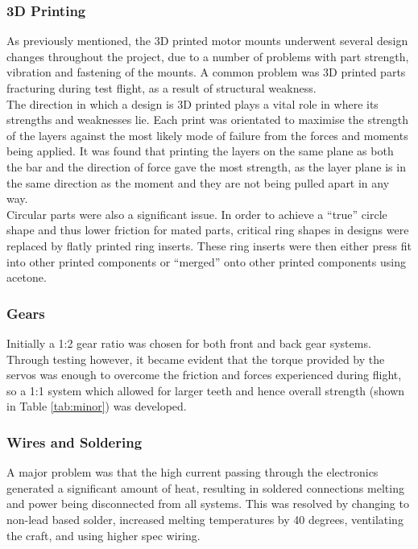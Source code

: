 \subsubsection*{3D Printing}
As previously mentioned, the 3D printed motor mounts underwent several design changes throughout the project, due to a number of problems with part strength, vibration and fastening of the mounts. A common problem was 3D printed parts fracturing during test flight, as a result of structural weakness.\\

The direction in which a design is 3D printed plays a vital role in where its strengths and weaknesses lie. Each print was orientated to maximise the strength of the layers against the most likely mode of failure from the forces and moments being applied. It was found that printing the layers on the same plane as both the bar and the direction of force gave the most strength, as the layer plane is in the same direction as the moment and they are not being pulled apart in any way.\\

Circular parts were also a significant issue. In order to achieve a ``true'' circle shape and thus lower friction for mated parts, critical ring shapes in designs were replaced by flatly printed ring inserts. These ring inserts were then either press fit into other printed components or ``merged'' onto other printed components using acetone. 

\subsubsection*{Gears}
Initially a 1:2 gear ratio was chosen for both front and back gear systems. Through testing however, it became evident that the torque provided by the servos was enough to overcome the friction and forces experienced during flight, so a 1:1 system which allowed for larger teeth and hence overall strength (shown in Table \ref{tab:minor}) was developed.

\subsubsection*{Wires and Soldering}
A major problem was that the high current passing through the electronics generated a significant amount of heat, resulting in soldered connections melting and power being disconnected from all systems. This was resolved by changing to non-lead based solder, increased melting temperatures by 40 degrees, ventilating the craft, and using higher spec wiring. 

